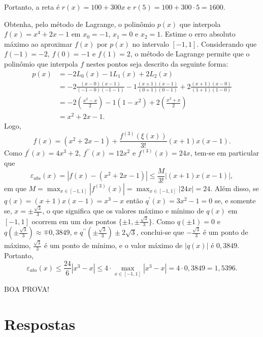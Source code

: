 \documentclass[12pt,a4paper]{article}
\begin{document}
\begin{ExerciseList}
\begin{enumerate}
Portanto, a reta é $r(x) = 100 + 300x$ e $r(5) = 100 + 300 \cdot 5 = 1600$.
\end{enumerate}

\Exercise[title={2,0}] Obtenha, pelo método de Lagrange, o polinômio $p(x)$ que interpola $f(x) = x^4+2x-1$ em $x_0 = -1$, $x_1 = 0$ e $x_2 = 1$. Estime o erro absoluto máximo ao aproximar $f(x)$ por $p(x)$ no intervalo $[-1, 1]$.
\Answer Considerando que $f(-1) = -2$, $f(0) = -1$ e $f(1) = 2$, o método de Lagrange permite que o polinômio que interpola $f$ nestes pontos seja descrito da seguinte forma:
\begin{align*}
p(x)
& = -2 L_0(x) -1 L_1(x) + 2 L_2(x) \\
& = -2 \frac{(x-0)(x-1)}{(-1-0)(-1-1)}
  -1 \frac{(x+1)(x-1)}{(0+1)(0-1)}
  +2 \frac{(x+1)(x-0)}{(1+1)(1-0)} \\
& = -2 \left(\frac{x^2-x}{2}\right)
  -1 (1-x^2)
  +2 \left(\frac{x^2+x}{2}\right) \\
&  = x^2+2x-1.
\end{align*}
Logo,
\[
f(x) = (x^2+2x-1) + \frac{f^{(3)}(\xi(x))}{3!}(x+1)x(x-1).
\]
Como $f^\prime(x) = 4x^3+2$, $f^{\prime\prime}(x) = 12x^2$ e $f^{(3)}(x) = 24x$, tem-se em particular que
\[
\varepsilon_{abs}(x)
= \left|f(x) - (x^2+2x-1)\right|
\leq \frac{M}{3!} \left|(x+1)x(x-1)\right|,
\]
em que $M
= \max_{x \in [-1,1]} \left|f^{(3)}(x)\right|
= \max_{x \in [-1,1]} \left|24x\right|
= 24$. Além disso, se $q(x) = (x+1)x(x-1) = x^3-x$ então $q^\prime(x) = 3x^2-1 = 0$ se, e somente se, $x = \pm\frac{\sqrt{3}}{3}$, o que significa que os valores máximo e mínimo de $q(x)$ em $[-1,1]$ ocorrem em um dos pontos $\{ \pm1, \pm\frac{\sqrt{3}}{3} \}$. Como $q(\pm1) = 0$ e $q(\pm\frac{\sqrt{3}}{3}) \approx \mp0,3849$, e $q^{\prime\prime}(\pm\frac{\sqrt{3}}{3}) \pm 2\sqrt{3}$, conclui-se que $-\frac{\sqrt{3}}{3}$ é um ponto de máximo, $\frac{\sqrt{3}}{3}$ é um ponto de mínimo, e o valor máximo de $|q(x)|$ é $0,3849$. Portanto,
\[
\varepsilon_{abs}(x)
\leq \frac{24}{6} \left|x^3 - x\right|
\leq 4 \cdot \max_{x \in [-1,1]} \left|x^3 - x\right|
= 4 \cdot 0,3849
= 1,5396.
\]
\end{ExerciseList}

\vspace{0.5cm}
\begin{center}
BOA PROVA!
\end{center}

\newpage
\restoregeometry
\section*{Respostas}
\shipoutAnswer
\end{document}
